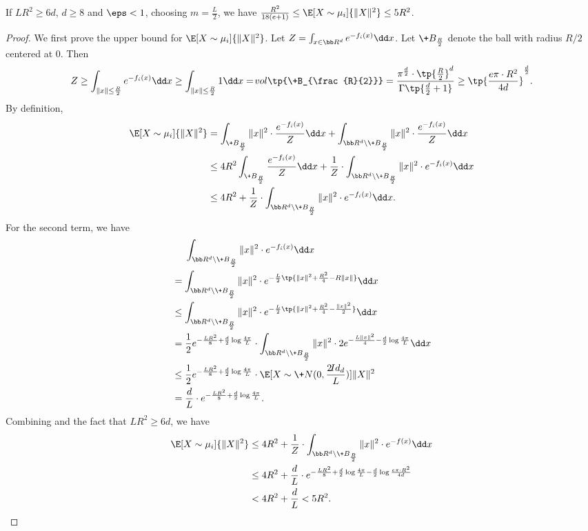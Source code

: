 \begin{lemma}\label{lem:lb-moment}
    If $LR^2\geq 6d$, $d\geq 8$ and $\eps<1$, choosing $m=\frac{L}{2}$, we have $\frac{R^2}{18(e+1)} \leq \E[X\sim \mu_i]{\|X\|^2} \leq 5R^2$.
\end{lemma}
\begin{proof}
    We first prove the upper bound for $\E[X\sim \mu_i]{\|X\|^2}$. Let $Z= \int_{x\in \bb R^d} e^{-f_i(x)} \dd x$. Let $\+B_{\frac{R}{2}}$ denote the ball with radius $R/2$ centered at $0$. Then 
    \begin{equation}
        Z\geq \int_{\|x\|\leq \frac{R}{2}} e^{-f_i(x)}\dd x \geq \int_{\|x\|\leq \frac{R}{2}} 1 \dd x = \!{vol}\tp{\+B_{\frac{R}{2}}} = \frac{\pi^{\frac{d}{2}}\cdot \tp{\frac{R}{2}}^{d}}{\Gamma\tp{\frac{d}{2}+1}} \geq \tp{\frac{e\pi\cdot R^2}{4d}}^{\frac{d}{2}}. \label{eq:lb-Z}
    \end{equation}
    By definition,
    \begin{align*}
        \E[X\sim \mu_i]{\|X\|^2} &= \int_{\+B_{\frac{R}{2}}} \|x\|^2\cdot \frac{e^{-f_i(x)}}{Z} \dd x + \int_{\bb R^d \setminus \+B_{\frac{R}{2}}} \|x\|^2\cdot \frac{e^{-f_i(x)}}{Z} \dd x \\
        &\leq 4R^2 \int_{\+B_{\frac{R}{2}}} \frac{e^{-f_i(x)}}{Z} \dd x + \frac{1}{Z}\cdot \int_{\bb R^d \setminus \+B_{\frac{R}{2}}} \|x\|^2\cdot e^{-f_i(x)} \dd x \\
        &\leq 4R^2 + \frac{1}{Z}\cdot \int_{\bb R^d \setminus \+B_{\frac{R}{2}}} \|x\|^2\cdot e^{-f_i(x)} \dd x.
    \end{align*}
    For the second term, we have
    \begin{align*}
        &\phantom{{}={}}\int_{\bb R^d \setminus \+B_{\frac{R}{2}}} \|x\|^2\cdot e^{-f_i(x)} \dd x \\
        &= \int_{\bb R^d \setminus \+B_{\frac{R}{2}}} \|x\|^2\cdot e^{-\frac{L}{2}\tp{\|x\|^2 + \frac{R^2}{4} - R\|x\|}} \dd x \\
        &\leq \int_{\bb R^d \setminus \+B_{\frac{R}{2}}} \|x\|^2\cdot e^{-\frac{L}{2}\tp{\|x\|^2 + \frac{R^2}{4} - \frac{\|x\|^2}{2}}} \dd x \\
        &= \frac{1}{2}e^{-\frac{LR^2}{8} + \frac{d}{2}\log \frac{4\pi}{L}}\cdot  \int_{\bb R^d \setminus \+B_{\frac{R}{2}}} \|x\|^2\cdot 2e^{-\frac{L\|x\|^2}{4} - \frac{d}{2}\log \frac{4\pi}{L}} \dd x\\
        &\leq \frac{1}{2}e^{-\frac{LR^2}{8} + \frac{d}{2}\log \frac{4\pi}{L}}\cdot \E[X\sim \+N(0, \frac{2\!{Id}_d}{L})]{\|X\|^2}\\
        &= \frac{d}{L}\cdot e^{-\frac{LR^2}{8} + \frac{d}{2}\log \frac{4\pi}{L}}.
    \end{align*}
    Combining  and the fact that $LR^2\geq 6d$, we have
    \begin{align*}
        \E[X\sim \mu_i]{\|X\|^2} &\leq 4R^2 + \frac{1}{Z}\cdot \int_{\bb R^d \setminus \+B_{\frac{R}{2}}} \|x\|^2\cdot e^{-f(x)} \dd x \\
        &\leq 4R^2 + \frac{d}{L}\cdot e^{-\frac{LR^2}{8} + \frac{d}{2}\log \frac{4\pi}{L} - \frac{d}{2}\log \frac{e\pi\cdot R^2}{4d}} \\
        &< 4R^2 + \frac{d}{L} < 5 R^2.
    \end{align*}
    \bigskip


\end{proof}
